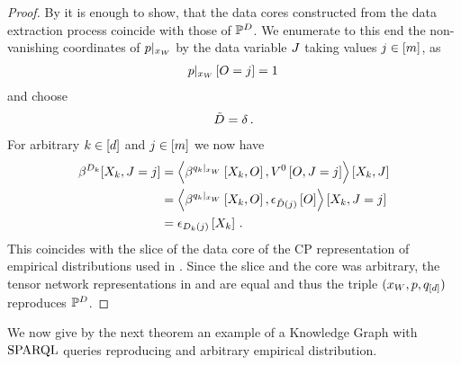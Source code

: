 \begin{proof}
    By  it is enough to show, that the data cores constructed from the data extraction process coincide with those of $\mathbb{P}^{D}$.
    We enumerate to this end the non-vanishing coordinates of ${p}|_{x_{W}}$ by the data variable $J$ taking values $j\in[m]$, as
    \begin{align*}
        {p}|_{x_{W}} \left[O=j\right] = 1 \,
    \end{align*}
    and choose
    \begin{align*}
        \tilde{D} = \delta \, .
    \end{align*}
    For arbitrary $k\in[d]$ and $j\in[m]$ we now have
    \begin{align*}
        \beta^{D_{k}}[X_{k},J=j]
        &= \left\langle 
            \beta^{{q_{k}}|_{x_{W}}}\left[X_{k},O\right],
            V^{0}\left[O,J=j\right]
        \right\rangle \left[ X_{k},J \right] \\
        &= \left\langle 
            \beta^{{q_{k}}|_{x_{W}}}\left[X_{k},O\right],
            \epsilon_{\tilde{D}(j)}\left[O\right]
        \right\rangle \left[ X_{k},J=j \right] \\
        &= \epsilon_{D_k(j)}\left[X_{k}\right] \, .
    \end{align*}
    This coincides with the slice of the data core of the CP representation of empirical distributions used in .
    Since the slice and the core was arbitrary, the tensor network representations in  and  are equal and thus the triple $(x_{W},p,q_{[d]})$ reproduces $\mathbb{P}^{D}$.
\end{proof}


We now give by the next theorem an example of a Knowledge Graph with $\mathrm{SPARQL}$ queries reproducing and arbitrary empirical distribution.

